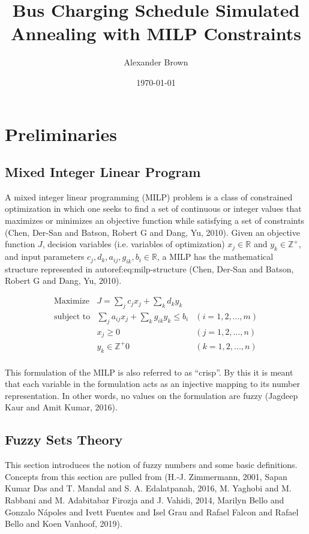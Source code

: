 \documentclass[11pt,a4paper,final]{article}
\author{Alexander Brown}
\date{\today}
\title{Bus Charging Schedule Simulated Annealing with MILP Constraints}
\begin{document}
\maketitle
\tableofcontents


\section{Preliminaries}
\label{sec:org62d2930}
\subsection{Mixed Integer Linear Program}
\label{sec:org180071e}
A mixed integer linear programming (MILP) problem is a class of constrained optimization in which one seeks to find a
set of continuous or integer values that maximizes or minimizes an objective function while satisfying a set of
constraints (Chen, Der-San and Batson, Robert G and Dang, Yu, 2010). Given an objective function \(J\), decision variables (i.e. variables of
optimization) \(x_j \in \mathbb{R}\) and \(y_k \in \mathbb{Z}^+\), and input parameters \(c_j, d_k, a_{ij}, g_{ik}, b_i \in \mathbb{R}\), a MILP has the
mathematical structure represented in autoref:eq:milp-structure (Chen, Der-San and Batson, Robert G and Dang, Yu, 2010).

\begin{equation}
\label{eq:milp-structure}
\begin{array}{lll}
\text{Maximize}   & J = \sum_j c_j x_j + \sum_k d_k y_k            &                 \\
\text{subject to} & \sum_j a_{ij} x_j + \sum_k g_{ik} y_k  \le b_i & (i = 1,2,...,m) \\
                  & x_j \ge 0                                      & (j = 1,2,...,n) \\
                  & y_k \in \mathbb{Z^+}0                          & (k = 1,2,...,n) \\
\end{array}
\end{equation}

This formulation of the MILP is also referred to as ``crisp''. By this it is meant that each variable in the formulation
acts as an injective mapping to its number representation. In other words, no values on the formulation are fuzzy
(Jagdeep Kaur and Amit Kumar, 2016).

\subsection{Fuzzy Sets Theory}
\label{sec:org9c71234}
This section introduces the notion of fuzzy numbers and some basic definitions. Concepts from this section are pulled
from (H.-J. Zimmermann, 2001, Sapan Kumar Das and T. Mandal and S. A. Edalatpanah, 2016, M. Yaghobi and M. Rabbani and M. Adabitabar Firozja and J. Vahidi, 2014, Marilyn Bello and Gonzalo N{\'a}poles and Ivett Fuentes and Isel Grau and Rafael Falcon and Rafael Bello and Koen Vanhoof, 2019).
\end{document}
